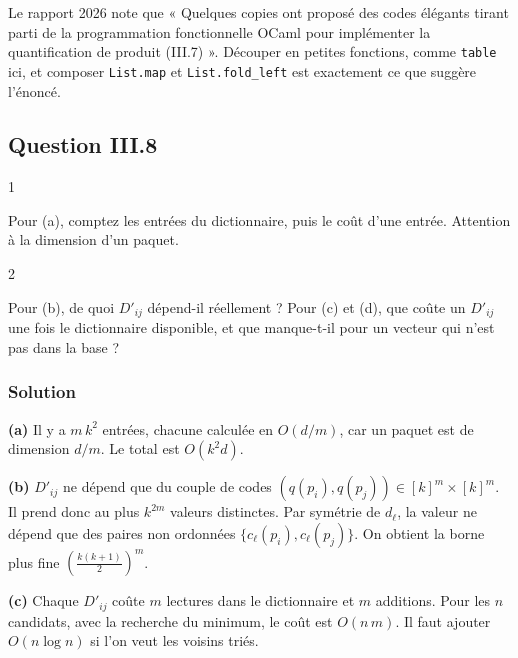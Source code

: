 \documentclass[11pt,a4paper]{article}
\begin{document}
\begin{jury}

Le rapport 2026 note que « Quelques copies ont proposé des codes élégants tirant parti de la programmation fonctionnelle OCaml pour implémenter la quantification de produit (III.7) ». Découper en petites fonctions, comme \texttt{table} ici, et composer \texttt{List.map} et \texttt{List.fold\_left} est exactement ce que suggère l'énoncé.

\end{jury}

\hypertarget{question-iii.8}{%
\subsection{Question III.8}\label{question-iii.8}}

\begin{indication}{1}

Pour (a), comptez les entrées du dictionnaire, puis le coût d'une entrée. Attention à la dimension d'un paquet.

\end{indication}

\begin{indication}{2}

Pour (b), de quoi \(D'_{ij}\) dépend-il réellement ? Pour (c) et (d), que coûte un \(D'_{ij}\) une fois le dictionnaire disponible, et que manque-t-il pour un vecteur qui n'est pas dans la base ?

\end{indication}

\hypertarget{solution-24}{%
\subsubsection{Solution}\label{solution-24}}

\textbf{(a)} Il y a \(m\,k^2\) entrées, chacune calculée en \(O(d/m)\), car un paquet est de dimension \(d/m\). Le total est \(\boxed{O(k^2 d)}\).

\textbf{(b)} \(D'_{ij}\) ne dépend que du couple de codes \((q(p_i),q(p_j))\in[k]^m\times[k]^m\). Il prend donc au plus \(\boxed{k^{2m}}\) valeurs distinctes. Par symétrie de \(d_\ell\), la valeur ne dépend que des paires non ordonnées \(\{c_\ell(p_i),c_\ell(p_j)\}\). On obtient la borne plus fine \(\left(\frac{k(k+1)}2\right)^m\).

\textbf{(c)} Chaque \(D'_{ij}\) coûte \(m\) lectures dans le dictionnaire et \(m\) additions. Pour les \(n\) candidats, avec la recherche du minimum, le coût est \(\boxed{O(n\,m)}\). Il faut ajouter \(O(n\log n)\) si l'on veut les voisins triés.
\end{document}
